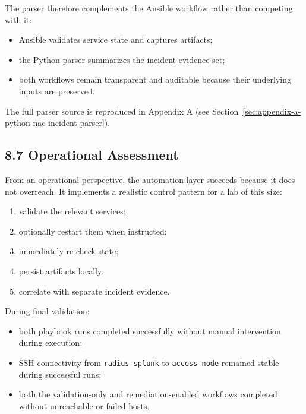 \documentclass[11pt]{article}
\begin{document}
The parser therefore complements the Ansible workflow rather than competing with it:

\begin{itemize}
    \item Ansible validates service state and captures artifacts;
    \item the Python parser summarizes the incident evidence set;
    \item both workflows remain transparent and auditable because their underlying inputs are preserved.
\end{itemize}

The full parser source is reproduced in Appendix A (see Section~\ref{sec:appendix-a-python-nac-incident-parser}).


\subsection{8.7 Operational Assessment}
\label{sec:operational-assessment}

From an operational perspective, the automation layer succeeds because it does not overreach. It implements a realistic control pattern for a lab of this size:

\begin{enumerate}
    \item validate the relevant services;
    \item optionally restart them when instructed;
    \item immediately re-check state;
    \item persist artifacts locally;
    \item correlate with separate incident evidence.
\end{enumerate}

During final validation:

\begin{itemize}
    \item both playbook runs completed successfully without manual intervention during execution;
    \item SSH connectivity from \texttt{radius-splunk} to \texttt{access-node} remained stable during successful runs;
    \item both the validation-only and remediation-enabled workflows completed without unreachable or failed hosts.
\end{itemize}
\end{document}
